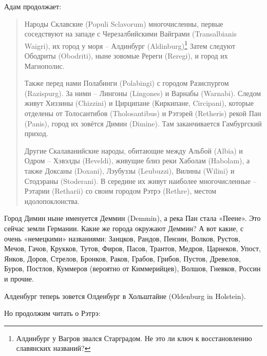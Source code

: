 Адам продолжает:

\begin{quotation}
Народы Склавские (Populi Sclavorum) многочисленны, первые соседствуют на западе с  Черезалбийскими Вайграми (Transalbianis Waigri), их город у моря – Алдинбург (Aldin\-burg)\footnote{Алдинбург у Вагров звался Старградом. Не это ли ключ к восстановлению славянских названий?} Затем следуют Ободриты (Obodriti), ны\-не зовомые Ререги (Reregi), и город их Магнополис.

Также перед нами Полабинги (Polabingi) с городом Разиспургом (Razispurg). За ними – Лингоны (Lingones) и Варнабы (Warnabi). Следом живут Хиззины (Chizzini) и Цирципане (Киркипане, Circipani), которые отделены от Толосантибов (Tholosantibus) и Рэтэрей (Retheris) рекой Пан (Panis), город их зовётся Димин (Dim\-ine). Там заканчивается Гамбургский приход.

Другие Скалаванийские народы, обитающие между Альбой (Albia) и Одром – Хэвэлды (Hevel\-di), живущие близ реки Хаболам (Habolam), а также Доксаны (Doxani), Лэубуззы (Leubuzzi), Вилины (Wilini) и Стодэраны (Stoderani). В середине их живут наиболее многочисленные – Рэтарии (Retharii) со своим городом Рэтрэ (Rethre), местом идолопоклонства.
\end{quotation}

Город Димин ныне именуется Деммин (Demmin), а река Пан стала «Пеене». Это сейчас земли Германии. Какие же города окружают Деммин? А вот какие, с очень «немецкими» названиями: Занцков, Рандов, Пензин, Волков, Рустов, Мечов, Гачов, Крукков, Тутов, Фиров, Пасов, Трантов, Медров, Царнеков, Упост, Янков, Доров, Стрелов, Бронков, Раков, Грабов, Грибов, Пустов, Древелов, Буров, Постлов, Куммеров (вероятно от Киммерийцев), Волшов, Гневков, Россин и прочие.

Алденбург теперь зовется Олденбург в Хольштайне (Olden\-burg in Holstein).

Но продолжим читать о Рэтрэ:


